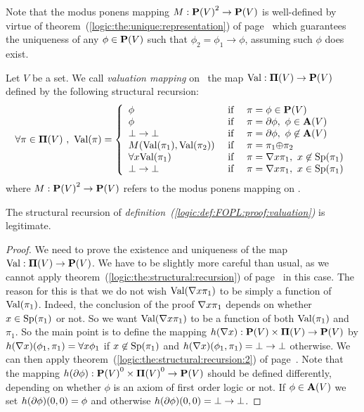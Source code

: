 Note that the modus ponens mapping $M:\mbox{${\bf P}(V)$}^{2}\to\mbox{${\bf P}(V)$}$ is well-defined
by virtue of theorem~(\ref{logic:the:unique:representation}) of
page~\pageref{logic:the:unique:representation} which guarantees the
uniqueness of any $\phi\in\mbox{${\bf P}(V)$}$ such that $\phi_{2}=\phi_{1}\to\phi$,
assuming such $\phi$ does exist.
\begin{defin}\label{logic:def:FOPL:proof:valuation}
Let $V$ be a set. We call {\em valuation mapping} on \pvs\ the map
$\mbox{\rm Val}:\mbox{${\bf\Pi}(V)$}\to\mbox{${\bf P}(V)$}$ defined by the following structural recursion:
\[
    \forall\pi\in\pvs\ ,\ \val(\pi)=\left\{
                    \begin{array}{lcl}
                    \phi&\mbox{\ if\ }&\pi=\phi\in\pv\\
                    \phi&\mbox{\ if\ }&\pi=\axi\phi,\ \phi\in\av\\
                    \bot\to\bot&\mbox{\ if\ }&\pi=\axi\phi,\ \phi\not\in\av\\
                    M(\val(\pi_{1}), \val(\pi_{2})) &\mbox{\ if\ }&\pi=\pi_{1}\pon\pi_{2}\\
                    \forall x\val(\pi_{1})&\mbox{\ if\ }&\pi=\gen
                    x\pi_{1},\  x\not\in\spec(\pi_{1})\\
                    \bot\to\bot&\mbox{\ if\ }&\pi=\gen
                    x\pi_{1},\  x\in\spec(\pi_{1})\\
                    \end{array}\right.
\]
where $M:\mbox{${\bf P}(V)$}^{2}\to\mbox{${\bf P}(V)$}$ refers to the modus ponens mapping on \pv.
\end{defin}
\begin{prop}
The structural recursion of {\em
definition~(\ref{logic:def:FOPL:proof:valuation})} is legitimate.
\end{prop}
\begin{proof}
We need to prove the existence and uniqueness of the map
$\mbox{\rm Val}:\mbox{${\bf\Pi}(V)$}\to\mbox{${\bf P}(V)$}$. We have to be slightly more careful than usual,
as we cannot apply theorem~(\ref{logic:the:structural:recursion}) of
page~\pageref{logic:the:structural:recursion} in this case. The
reason for this is that we do not wish $\mbox{\rm Val}(\mbox{$\nabla$} x\pi_{1})$ to be
simply a function of $\mbox{\rm Val}(\pi_{1})$. Indeed, the conclusion of the
proof $\mbox{$\nabla$} x\pi_{1}$ depends on whether $x\in\mbox{\rm Sp}(\pi_{1})$ or
not. So we want $\mbox{\rm Val}(\mbox{$\nabla$} x\pi_{1})$ to be a function of both
$\mbox{\rm Val}(\pi_{1})$ and $\pi_{1}$. So the main point is to define the
mapping $h(\mbox{$\nabla$} x):\mbox{${\bf P}(V)$}\times\mbox{${\bf\Pi}(V)$}\to\mbox{${\bf P}(V)$}$ by $h(\mbox{$\nabla$}
x)(\phi_{1},\pi_{1}) =\forall x\phi_{1}$ if $x\not\in\mbox{\rm Sp}(\pi_{1})$
and $h(\mbox{$\nabla$} x)(\phi_{1},\pi_{1})=\bot\to\bot$ otherwise. We can then
apply theorem~(\ref{logic:the:structural:recursion:2}) of
page~\pageref{logic:the:structural:recursion:2}. Note that the
mapping $h(\mbox{$\partial$}\phi):\mbox{${\bf P}(V)$}^{0}\times\mbox{${\bf\Pi}(V)$}^{0}\to\mbox{${\bf P}(V)$}$ should be defined
differently, depending on whether $\phi$ is an axiom of first order
logic or not. If $\phi\in\mbox{${\bf A}(V)$}$ we set $h(\mbox{$\partial$}\phi)(0,0)=\phi$ and
otherwise $h(\mbox{$\partial$}\phi)(0,0)=\bot\to\bot$.
\end{proof}
